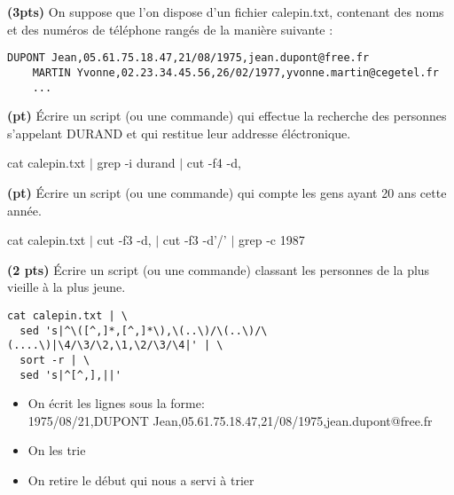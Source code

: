 \documentclass[10pt]{article}
\begin{document}
\begin{Exercice}\textbf{(3pts)} %
  On suppose que l'on dispose d'un fichier calepin.txt, contenant des noms et
  des numéros de téléphone rangés de la manière suivante :
  \begin{Verbatim}[label=calepin.txt,gobble=4]
    DUPONT Jean,05.61.75.18.47,21/08/1975,jean.dupont@free.fr
    MARTIN Yvonne,02.23.34.45.56,26/02/1977,yvonne.martin@cegetel.fr
    ...
  \end{Verbatim}

  \Question \textbf{(\textonehalf pt)} Écrire un script (ou une commande) qui
  effectue la recherche des personnes s'appelant DURAND et qui restitue leur
  addresse éléctronique.

  \begin{Reponse}
cat calepin.txt $|$ grep -i durand $|$ cut -f4 -d,
  \end{Reponse}

  \Question \textbf{(\textonehalf pt)} Écrire un script (ou une commande) qui
  compte les gens ayant 20 ans cette année.
  \begin{Reponse}
    cat calepin.txt $|$ cut -f3 -d, $|$ cut -f3 -d'/' $|$ grep -c 1987
  \end{Reponse}

  \Question \textbf{(2 pts)} Écrire un script (ou une commande) classant les
  personnes de la plus vieille à la plus jeune.
  \begin{Reponse}
    \begin{Verbatim}
cat calepin.txt | \
  sed 's|^\([^,]*,[^,]*\),\(..\)/\(..\)/\(....\)|\4/\3/\2,\1,\2/\3/\4|' | \
  sort -r | \
  sed 's|^[^,],||'
    \end{Verbatim}
    \begin{itemize}
    \item On écrit les lignes sous la forme:\\
      1975/08/21,DUPONT Jean,05.61.75.18.47,21/08/1975,jean.dupont@free.fr
    \item On les trie
    \item On retire le début qui nous a servi à trier
    \end{itemize}
  \end{Reponse}


\end{Exercice}
\end{document}
